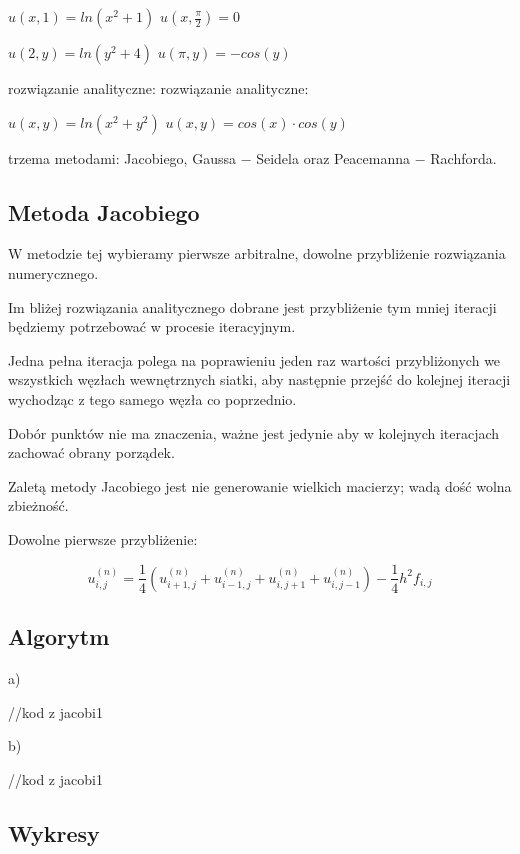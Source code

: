 $u(x,1) = ln(x^2 + 1)$ \hspace{3.28cm} $u(x,\frac{\pi}{2}) = 0$

$u(2,y) = ln(y^2 + 4)$ \hspace{3.3cm} $u(\pi,y) = -cos(y)$

rozwiązanie analityczne: \hspace{2.6cm} rozwiązanie analityczne:

$u(x,y) = ln(x^2 + y^2)$ \hspace{3.1cm} $u(x,y) = cos(x)\cdot cos(y)$

\vspace{0.5cm}

trzema metodami: Jacobiego, Gaussa $-$ Seidela oraz Peacemanna $-$ Rachforda.

\subsection{Metoda Jacobiego}

W metodzie tej wybieramy pierwsze arbitralne, dowolne przybliżenie rozwiązania numerycznego.

Im bliżej rozwiązania analitycznego dobrane jest przybliżenie tym mniej iteracji będziemy potrzebować w procesie iteracyjnym.

Jedna pełna iteracja polega na poprawieniu jeden raz wartości przybliżonych we wszystkich węzłach wewnętrznych siatki, aby następnie przejść do kolejnej iteracji wychodząc z tego samego węzła co poprzednio.

Dobór punktów nie ma znaczenia, ważne jest jedynie aby w kolejnych iteracjach zachować obrany porządek.

Zaletą metody Jacobiego jest nie generowanie wielkich macierzy; wadą dość wolna zbieżność.

Dowolne pierwsze przybliżenie:

$$u_{i,j}^{(n)} = \frac{1}{4}(u_{i+1,j}^{(n)} + u_{i-1,j}^{(n)} + u_{i,j+1}^{(n)} + u_{i,j-1}^{(n)}) - \frac{1}{4}h^2f_{i,j}$$

\subsection{Algorytm}

a)

//kod z jacobi1

b)

//kod z jacobi1

\subsection{Wykresy}

